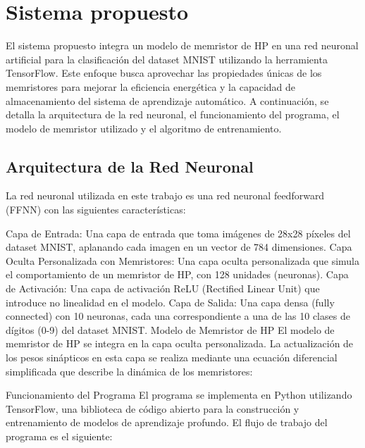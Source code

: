 \documentclass[conference]{IEEEtran}
\begin{document}
\section{Sistema propuesto}

El sistema propuesto integra un modelo de memristor de HP en una red neuronal artificial para la clasificación del dataset MNIST utilizando la herramienta TensorFlow. Este enfoque busca aprovechar las propiedades únicas de los memristores para mejorar la eficiencia energética y la capacidad de almacenamiento del sistema de aprendizaje automático. A continuación, se detalla la arquitectura de la red neuronal, el funcionamiento del programa, el modelo de memristor utilizado y el algoritmo de entrenamiento.

\subsection{Arquitectura de la Red Neuronal}
La red neuronal utilizada en este trabajo es una red neuronal feedforward (FFNN) con las siguientes características:

Capa de Entrada: Una capa de entrada que toma imágenes de 28x28 píxeles del dataset MNIST, aplanando cada imagen en un vector de 784 dimensiones.
Capa Oculta Personalizada con Memristores: Una capa oculta personalizada que simula el comportamiento de un memristor de HP, con 128 unidades (neuronas).
Capa de Activación: Una capa de activación ReLU (Rectified Linear Unit) que introduce no linealidad en el modelo.
Capa de Salida: Una capa densa (fully connected) con 10 neuronas, cada una correspondiente a una de las 10 clases de dígitos (0-9) del dataset MNIST.
Modelo de Memristor de HP
El modelo de memristor de HP se integra en la capa oculta personalizada. La actualización de los pesos sinápticos en esta capa se realiza mediante una ecuación diferencial simplificada que describe la dinámica de los memristores:

Funcionamiento del Programa
El programa se implementa en Python utilizando TensorFlow, una biblioteca de código abierto para la construcción y entrenamiento de modelos de aprendizaje profundo. El flujo de trabajo del programa es el siguiente:
\end{document}
